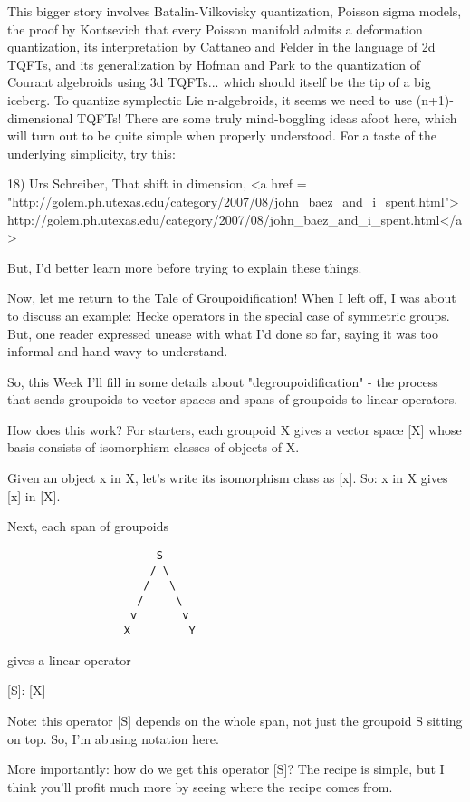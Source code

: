 This bigger story involves Batalin-Vilkovisky quantization, 
Poisson sigma models, the proof by Kontsevich that every Poisson 
manifold admits a deformation quantization, its interpretation 
by Cattaneo and Felder in the language of 2d TQFTs, and its 
generalization by Hofman and Park to the quantization of Courant 
algebroids using 3d TQFTs... which should itself be the tip of a big
iceberg.  To quantize symplectic Lie n-algebroids, it seems we
need to use (n+1)-dimensional TQFTs! There are some truly 
mind-boggling ideas afoot here, which will turn out to be quite 
simple when properly understood.  For a taste of the underlying 
simplicity, try this:

18) Urs Schreiber, That shift in dimension,
<a href = "http://golem.ph.utexas.edu/category/2007/08/john_baez_and_i_spent.html">http://golem.ph.utexas.edu/category/2007/08/john_baez_and_i_spent.html</a>

But, I'd better learn more before trying to explain these things.

Now, let me return to the Tale of Groupoidification!  When I left
off, I was about to discuss an example: Hecke operators in the 
special case of symmetric groups.  But, one reader expressed 
unease with what I'd done so far, saying it was too informal and 
hand-wavy to understand.  

So, this Week I'll fill in some details about "degroupoidification" - 
the process that sends groupoids to vector spaces and spans of 
groupoids to linear operators.  

How does this work?  For starters, each groupoid X gives a vector 
space [X] whose basis consists of isomorphism classes of objects 
of X.   

Given an object x in X, let's write its isomorphism class 
as [x].  So: x in X gives [x] in [X].

Next, each span of groupoids 

\begin{verbatim}
                       S
                      / \
                     /   \
                    /     \
                   v       v
                  X         Y
\end{verbatim}
    

gives a linear operator 

[S]: [X] \to  [Y]

Note: this operator [S] depends on the whole span, not just the
groupoid S sitting on top.  So, I'm abusing notation here.

More importantly: how do we get this operator [S]?  The recipe is
simple, but I think you'll profit much more by seeing where the 
recipe comes from.

